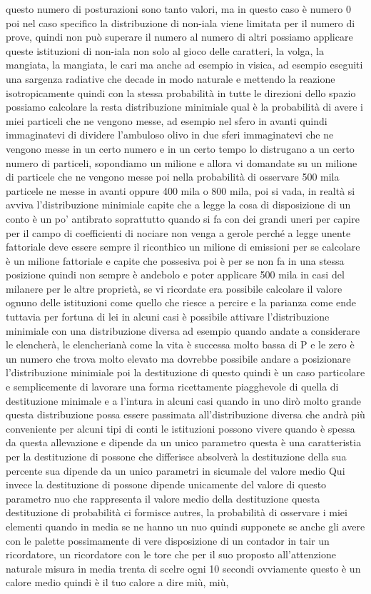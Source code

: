 questo numero di posturazioni sono tanto valori, ma in questo caso è numero 0 poi nel caso specifico la distribuzione di non-iala viene limitata per il numero di prove, quindi non può superare il numero al numero di altri possiamo applicare queste istituzioni di non-iala non solo al gioco delle caratteri, la volga, la mangiata, la mangiata, le cari ma anche ad esempio in visica, ad esempio eseguiti una sargenza radiative che decade in modo naturale e mettendo la reazione isotropicamente quindi con la stessa probabilità in tutte le direzioni dello spazio possiamo calcolare la resta distribuzione minimiale qual è la probabilità di avere i miei particeli che ne vengono messe, ad esempio nel sfero in avanti quindi immaginatevi di dividere l'ambuloso olivo in due sferi immaginatevi che ne vengono messe in un certo numero e in un certo tempo lo distrugano a un certo numero di particeli, sopondiamo un milione e allora vi domandate su un milione di particele che ne vengono messe poi nella probabilità di osservare 500 mila particele ne messe in avanti oppure 400 mila o 800 mila, poi si vada, in realtà si avviva l'distribuzione minimiale capite che a legge la cosa di disposizione di un conto è un po' antibrato soprattutto quando si fa con dei grandi uneri per capire per il campo di coefficienti di nociare non venga a gerole perché a legge unente fattoriale deve essere sempre il riconthico un milione di emissioni per se calcolare è un milione fattoriale e capite che possesiva poi è per se non fa in una stessa posizione quindi non sempre è andebolo e poter applicare 500 mila in casi del milanere per le altre proprietà, se vi ricordate era possibile calcolare il valore ognuno delle istituzioni come quello che riesce a percire e la parianza come ende tuttavia per fortuna di lei in alcuni casi è possibile attivare l'distribuzione minimiale con una distribuzione diversa ad esempio quando andate a considerare le elencherà, le elencherianà come la vita è successa molto bassa di P e le zero è un numero che trova molto elevato ma dovrebbe possibile andare a posizionare l'distribuzione minimiale poi la destituzione di questo quindi è un caso particolare e semplicemente di lavorare una forma ricettamente piagghevole di quella di destituzione minimale e a l'intura in alcuni casi quando in uno dirò molto grande questa distribuzione possa essere passimata all'distribuzione diversa che andrà più conveniente per alcuni tipi di conti le istituzioni possono vivere quando è spessa da questa allevazione e dipende da un unico parametro questa è una caratteristia per la destituzione di possone che differisce absolverà la destituzione della sua percente sua dipende da un unico parametri in sicumale del valore medio Qui invece la destituzione di possone dipende unicamente del valore di questo parametro nuo che rappresenta il valore medio della destituzione questa destituzione di probabilità ci formisce autres, la probabilità di osservare i miei elementi quando in media se ne hanno un nuo quindi supponete se anche gli avere con le palette possimamente di vere disposizione di un contador in tair un ricordatore, un ricordatore con le tore che per il suo proposto all'attenzione naturale misura in media trenta di scelre ogni 10 secondi ovviamente questo è un calore medio quindi è il tuo calore a dire miù, miù, 